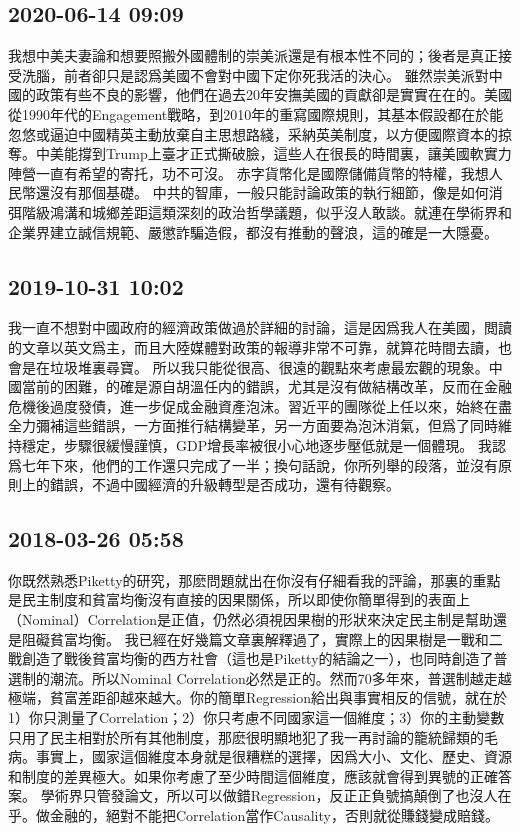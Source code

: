 \documentclass[twocolumn]{ctexart}
\begin{document}
\subsection*{2020-06-14 09:09}

我想中美夫妻論和想要照搬外國體制的崇美派還是有根本性不同的；後者是真正接受洗腦，前者卻只是認爲美國不會對中國下定你死我活的決心。
雖然崇美派對中國的政策有些不良的影響，他們在過去20年安撫美國的貢獻卻是實實在在的。美國從1990年代的Engagement戰略，到2010年的重寫國際規則，其基本假設都在於能忽悠或逼迫中國精英主動放棄自主思想路綫，采納英美制度，以方便國際資本的掠奪。中美能撐到Trump上臺才正式撕破臉，這些人在很長的時間裏，讓美國軟實力陣營一直有希望的寄托，功不可沒。
赤字貨幣化是國際儲備貨幣的特權，我想人民幣還沒有那個基礎。
中共的智庫，一般只能討論政策的執行細節，像是如何消弭階級鴻溝和城鄉差距這類深刻的政治哲學議題，似乎沒人敢談。就連在學術界和企業界建立誠信規範、嚴懲詐騙造假，都沒有推動的聲浪，這的確是一大隱憂。
\subsection*{2019-10-31 10:02}

我一直不想對中國政府的經濟政策做過於詳細的討論，這是因爲我人在美國，閲讀的文章以英文爲主，而且大陸媒體對政策的報導非常不可靠，就算花時間去讀，也會是在垃圾堆裏尋寶。
所以我只能從很高、很遠的觀點來考慮最宏觀的現象。中國當前的困難，的確是源自胡溫任内的錯誤，尤其是沒有做結構改革，反而在金融危機後過度發債，進一步促成金融資產泡沫。習近平的團隊從上任以來，始終在盡全力彌補這些錯誤，一方面推行結構變革，另一方面要為泡沐消氣，但爲了同時維持穩定，步驟很緩慢謹慎，GDP增長率被很小心地逐步壓低就是一個體現。
我認爲七年下來，他們的工作還只完成了一半；換句話說，你所列舉的段落，並沒有原則上的錯誤，不過中國經濟的升級轉型是否成功，還有待觀察。
\subsection*{2018-03-26 05:58}

你既然熟悉Piketty的研究，那麽問題就出在你沒有仔細看我的評論，那裏的重點是民主制度和貧富均衡沒有直接的因果關係，所以即使你簡單得到的表面上（Nominal）Correlation是正值，仍然必須視因果樹的形狀來決定民主制是幫助還是阻礙貧富均衡。 
我已經在好幾篇文章裏解釋過了，實際上的因果樹是一戰和二戰創造了戰後貧富均衡的西方社會（這也是Piketty的結論之一），也同時創造了普選制的潮流。所以Nominal Correlation必然是正的。然而70多年來，普選制越走越極端，貧富差距卻越來越大。你的簡單Regression給出與事實相反的信號，就在於1）你只測量了Correlation；2）你只考慮不同國家這一個維度；3）你的主動變數只用了民主相對於所有其他制度，那麽很明顯地犯了我一再討論的籠統歸類的毛病。事實上，國家這個維度本身就是很糟糕的選擇，因爲大小、文化、歷史、資源和制度的差異極大。如果你考慮了至少時間這個維度，應該就會得到異號的正確答案。 
學術界只管發論文，所以可以做錯Regression，反正正負號搞顛倒了也沒人在乎。做金融的，絕對不能把Correlation當作Causality，否則就從賺錢變成賠錢。
\end{document}
